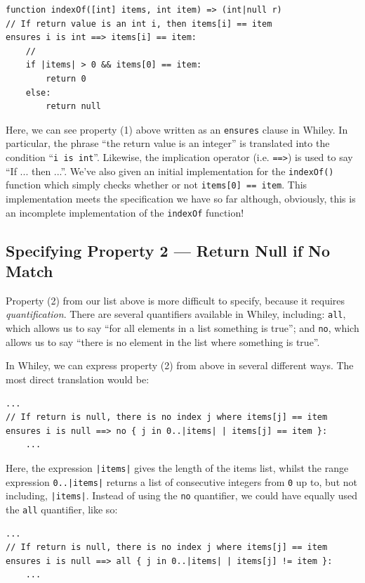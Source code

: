 \begin{lstlisting}
function indexOf([int] items, int item) => (int|null r)
// If return value is an int i, then items[i] == item
ensures i is int ==> items[i] == item:
    //
    if |items| > 0 && items[0] == item:
        return 0
    else:
        return null
\end{lstlisting}

Here, we can see property (1) above written as an \lstinline{ensures}
clause in Whiley.  In particular, the phrase ``the return value is an
integer'' is translated into the condition ``\lstinline{i is int}''.
Likewise, the implication operator (i.e. \lstinline{==>}) is used to
say ``If ... then ...''.  We've also given an initial implementation
for the \lstinline{indexOf()} function which simply checks whether or
not \lstinline{items[0] == item}.  This implementation meets the
specification we have so far although, obviously, this is an
incomplete implementation of the \lstinline{indexOf} function!

\subsection{Specifying Property 2 --- Return Null if No Match}
Property (2) from our list above is more difficult to specify, because
it requires {\em quantification}.  There are several quantifiers
available in Whiley, including: \lstinline{all}, which allows us to
say ``for all elements in a list something is true''; and
\lstinline{no}, which allows us to say ``there is no element in the list
where something is true''. 

In Whiley, we can express property (2) from above in several different
ways.  The most direct translation would be:

\begin{lstlisting}
...
// If return is null, there is no index j where items[j] == item
ensures i is null ==> no { j in 0..|items| | items[j] == item }:
    ...
\end{lstlisting}

\noindent Here, the expression \lstinline{|items|} gives the length of
the items list, whilst the range expression \lstinline{0..|items|}
returns a list of consecutive integers from \lstinline{0} up to, but
not including, \lstinline{|items|}.  Instead of using the
\lstinline{no} quantifier, we could have equally used the
\lstinline{all} quantifier, like so:

\begin{lstlisting}
...
// If return is null, there is no index j where items[j] == item
ensures i is null ==> all { j in 0..|items| | items[j] != item }:
    ...
\end{lstlisting}

